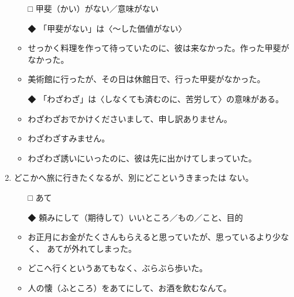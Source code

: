 \documentclass[
uplatex,
b5paper,
10pt,
dvipdfmx
]{jsbook}
\begin{document}
\begin{enumerate}
\begin{itemize}
\item[□] 甲斐（かい）がない／意味がない
\item[◆] 「甲斐がない」は〈〜した価値がない〉
\end{itemize}
\begin{itemize}
 \item せっかく料理を作って待っていたのに、彼は来なかった。作った甲斐が
       なかった。
 \item 美術館に行ったが、その日は休館日で、行った甲斐がなかった。
\end{itemize}

\begin{itemize}
\item[◆] 「わざわざ」は〈しなくても済むのに、苦労して〉の意味がある。
\end{itemize}
\begin{itemize}
 \item わざわざおでかけくださいまして、申し訳ありません。 
 \item わざわざすみません。      
 \item わざわざ誘いにいったのに、彼は先に出かけてしまっていた。 
\end{itemize}


\item どこかへ旅に行きたくなるが、別にどこというきまった\underline{\hspace{3zw}}は
      ない。
\begin{itemize}
\item[□] あて
\item[◆] 頼みにして（期待して）いいところ／もの／こと、目的
\end{itemize}
\begin{itemize}
\item お正月にお金がたくさんもらえると思っていたが、思っているより少なく、
      あてが外れてしまった。
\item どこへ行くというあてもなく、ぶらぶら歩いた。 
\item 人の懐（ふところ）をあてにして、お酒を飲むなんて。
\end{itemize}


\end{enumerate}
\end{document}
